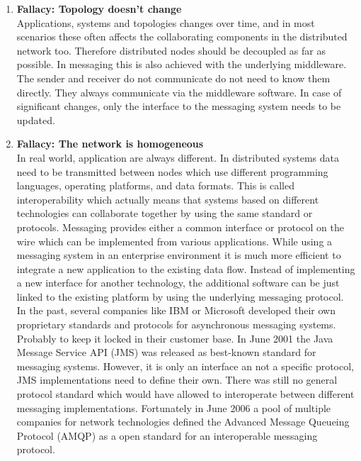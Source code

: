 \begin{enumerate}
{        as data structure (first-in-first-out).
        }
    \item{\textbf{Fallacy: Topology doesn't change} \hfill \\
        Applications, systems and topologies changes over time, and in most
        scenarios these often affects the collaborating components in the
        distributed network too. Therefore distributed nodes should be decoupled as
        far as possible. In messaging this is also achieved with the underlying
        middleware. The sender and receiver do not communicate do not need to
        know them directly. They always communicate via the middleware software.
        In case of significant changes, only the interface to the messaging
        system needs to be updated. }
    \item{\textbf{Fallacy: The network is homogeneous}\hfill \\
        In real world, application are always different. In distributed systems
        data need to be transmitted between nodes which use different
        programming languages, operating platforms, and data formats.
        This is called interoperability  which actually means that
        systems based on different technologies can collaborate together by using
        the same standard or protocols. Messaging provides either a common
        interface or protocol on the wire which can be implemented from various
        applications. While using a messaging system in an
        enterprise environment it is much more efficient to integrate a new
        application to the existing data flow. Instead of implementing a new
        interface for another technology, the additional software can be just
        linked to the existing platform by using the underlying messaging
        protocol.\\

        In the past, several companies like IBM or Microsoft developed their own
        proprietary standards and protocols for asynchronous messaging systems.
        Probably to keep it locked in their customer base. In June 2001 the Java
        Message Service API (JMS) was released as best-known standard for
        messaging systems. However, it is only an interface an not a specific
        protocol, JMS implementations need to define their own. There was still
        no general protocol standard which would have allowed to interoperate
        between different messaging implementations. Fortunately in June 2006 a
        pool of multiple companies for network technologies defined the Advanced
        Message Queueing Protocol (AMQP) as a open standard for an interoperable
        messaging protocol. \cite{PrpAMQP}

}
\end{enumerate}
